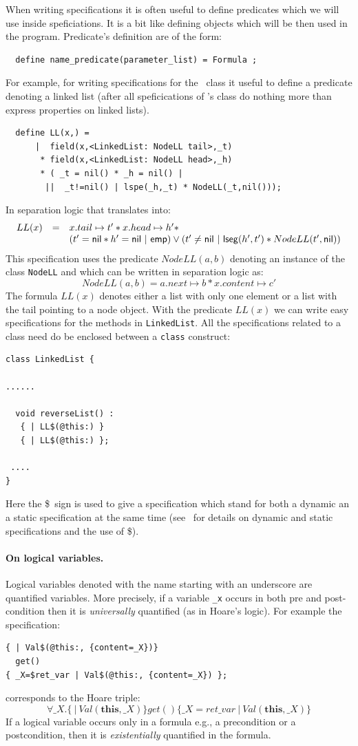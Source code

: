 \documentclass[11pt]{article}
\newcommand{\psto}{\mapsto}
\newcommand{\emp}{{\sf emp}}
\newcommand{\lseg}{{\sf lseg}}
\newcommand{\nil}{{\sf nil}}
\newcommand{\this}{\mathbf{this}}
\newcommand{\dollar}{\mbox{\$}}
\begin{document}
When writing specifications it is often useful to define predicates
which we will use inside speficiations. It is a bit like defining
objects which will be then used in the program. Predicate's definition
are of the form:
\begin{verbatim}
  define name_predicate(parameter_list) = Formula ;
\end{verbatim}
For example, for writing specifications for the \linkedlist \ class it
useful to define a predicate denoting a linked list (after all
speficications of \linkedlist's class do nothing more than express
properties on linked lists).
\begin{verbatim}
  define LL(x,) =  
      |  field(x,<LinkedList: NodeLL tail>,_t) 
       * field(x,<LinkedList: NodeLL head>,_h) 
       * ( _t = nil() * _h = nil() | 
        ||  _t!=nil() | lspe(_h,_t) * NodeLL(_t,nil())); 
\end{verbatim}
In separation logic that translates into:
\[\begin{array}{lll}
 LL(x) & = &  x.tail \psto t' * x.head \psto h' * 
\\
& & (t'=\nil * h'=\nil \ | \ \emp ) 
\vee 
(t' \neq \nil \ | \ \lseg(h',t') *NodeLL(t',\nil) )  
\end{array}
\]
This specification uses the predicate $NodeLL(a,b)$ denoting an instance of the class {\tt NodeLL}
and which can be written in separation logic as:
\[
  NodeLL(a,b) = a.next \psto b * x.content \psto c' 
\]
The formula
$LL(x)$ denotes either a list with only one element or a list with
the tail pointing to a node object. With the predicate $LL(x)$ we can
write easy specifications for the methods in {\tt LinkedList}.
All the specifications related to a class need do be enclosed between
a {\tt class} construct:
\begin{verbatim}
class LinkedList {

......

  void reverseList() : 
   { | LL$(@this:) } 
   { | LL$(@this:) };

 ....
}
\end{verbatim}
Here the \dollar \ sign is used to give a specification which stand for both a dynamic an a static specification at the same time (see~\cite{jstar} for details on dynamic and static specifications and the use of \dollar).
\paragraph{On logical variables.}
Logical variables denoted with the name starting with an underscore
are quantified variables. More precisely, if a variable {\tt \_x}
occurs in both pre and post-condition then it is {\em universally}
quantified (as in Hoare's logic). For example the specification:
\begin{verbatim}
{ | Val$(@this:, {content=_X})} 
  get()
{ _X=$ret_var | Val$(@this:, {content=_X}) };
\end{verbatim}
corresponds to the Hoare triple:
\[
\forall \_X. \{ \ | \ Val(\this,\_X) \} get() \{ \_X=ret\_var \ |\  Val(\this, \_X)\}
\]
If a logical variable occurs only in a formula  e.g., a precondition or a postcondition, 
then it is {\em existentially} quantified in the formula.
\end{document}
